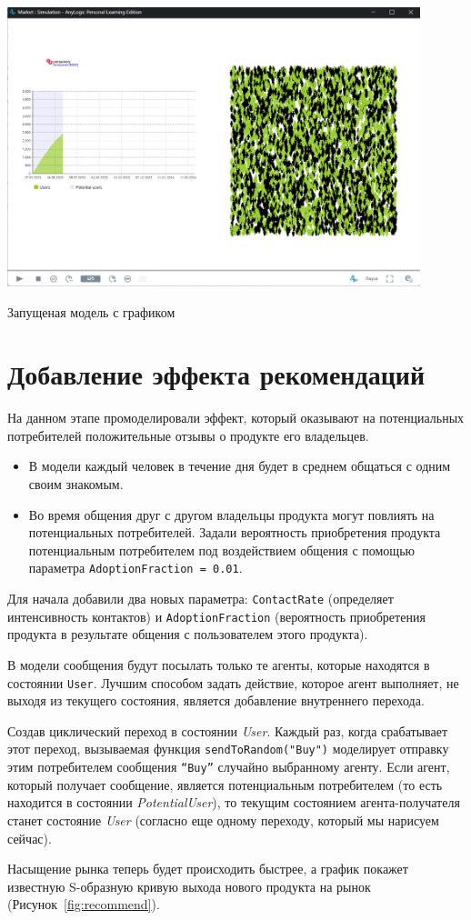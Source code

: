 \begin{image}
	\includegraphics[width=0.9\textwidth]{2023-03-28_17-04-51}
	\caption{Запущеная модель с графиком}
	\label{fig:graphic}
\end{image}

\section{Добавление эффекта рекомендаций}
На данном этапе промоделировали эффект, который оказывают на потенциальных
потребителей положительные отзывы о продукте его владельцев.

\begin{itemize}
	\item В модели каждый человек в течение дня будет в среднем
		общаться с одним своим знакомым.
	\item Во время общения друг с другом владельцы продукта могут повлиять на
		потенциальных потребителей. Задали вероятность приобретения
		продукта потенциальным потребителем под воздействием общения с
		помощью параметра \texttt{AdoptionFraction = 0.01}.
\end{itemize}

Для начала добавили два новых параметра: \texttt{ContactRate} (определяет
интенсивность контактов) и \texttt{AdoptionFraction} (вероятность приобретения
продукта в результате общения с пользователем этого продукта).\par
В модели сообщения будут посылать только те агенты, которые находятся
в состоянии \texttt{User}. Лучшим способом задать действие,
которое агент выполняет, не выходя из текущего состояния,
является добавление внутреннего перехода.\par
Создав циклический переход в состоянии \textit{User}. Каждый раз, когда
срабатывает этот переход, вызываемая функция \texttt{sendToRandom("Buy")}
моделирует отправку этим потребителем сообщения \texttt{“Buy”} случайно
выбранному агенту. Если агент, который получает сообщение, является
потенциальным потребителем (то есть находится в состоянии
\textit{PotentialUser}), то текущим состоянием агента-получателя станет
состояние \textit{User} (согласно еще одному переходу,
который мы нарисуем сейчас).\par
Насыщение рынка теперь будет происходить быстрее, а график покажет
известную S-образную кривую выхода нового продукта на рынок
(Рисунок~\ref{fig:recommend}).

